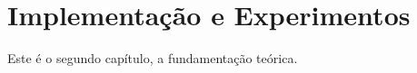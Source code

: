 
\chapter{Implementação e Experimentos}

Este \'e o segundo cap\'itulo, a fundamenta\c{c}\~ao te\'orica.
